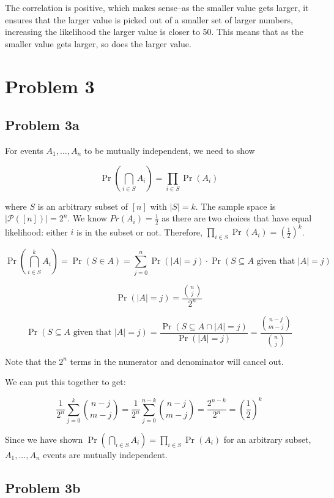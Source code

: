 \documentclass{article}
\begin{document}
The correlation is positive, which makes sense--as the smaller value gets larger, it ensures that the larger value is picked out of a smaller set of larger numbers, increasing the likelihood the larger value is closer to 50. This means that as the smaller value gets larger, so does the larger value.

\section{Problem 3}

\subsection{Problem 3a}

For events $A_1, ..., A_n$ to be mutually independent, we need to show

$$
\Pr \left(\bigcap_{i \in S} A_i \right) = \prod_{i \in S} \Pr(A_i)
$$

\noindent where $S$ is an arbitrary subset of $[n]$ with $|S| = k$. The sample space is $|\mathcal{P}([n])| = 2^n$. We know $Pr(A_i) = \frac{1}{2}$ as there are two choices that have equal likelihood: either $i$ is in the subset or not. Therefore, $\prod_{i \in S} \Pr(A_i) = \left(\frac{1}{2} \right)^k$.

$$
\Pr \left(\bigcap_{i \in S}^{k} A_i \right) = \Pr(S \in A) = \sum_{j = 0}^{n} \Pr(|A| = j) \cdot \Pr(S \subseteq A \text{ given that } |A| = j)
$$

$$
\Pr(|A| = j) = \frac{\binom{n}{j}}{2^n}
$$

$$
\Pr(S \subseteq A \text{ given that } |A| = j) = \frac{\Pr(S \subseteq A \cap |A| = j)}{\Pr(|A| = j)} = \frac{\binom{n - j}{m - j}}{\binom{n}{j}} 
$$

\noindent Note that the $2^n$ terms in the numerator and denominator will cancel out. 

\noindent We can put this together to get:

$$
\frac{1}{2^n} \sum_{j = 0}^{k} \binom{n - j}{m - j} = \frac{1}{2^n} \sum_{j = 0}^{n - k} \binom{n - j}{m - j} = \frac{2^{n - k}}{2^n} = \left(\frac{1}{2} \right)^k
$$

\noindent Since we have shown  $\Pr \left(\bigcap_{i \in S} A_i \right) = \prod_{i \in S} \Pr(A_i)$ for an arbitrary subset, $A_1, ..., A_n$ events are mutually independent.

\subsection{Problem 3b}
\end{document}
